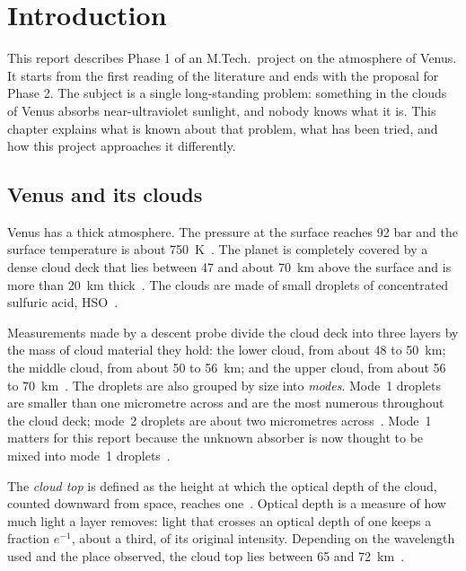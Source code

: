 
\chapter{Introduction}
\label{ch:intro}

This report describes Phase 1 of an M.Tech.\ project on the atmosphere of Venus. It
starts from the first reading of the literature and ends with the proposal for Phase 2.
The subject is a single long-standing problem: something in the clouds of Venus absorbs
near-ultraviolet sunlight, and nobody knows what it is. This chapter explains what is
known about that problem, what has been tried, and how this project approaches it
differently.

\section{Venus and its clouds}
\label{sec:venus}

Venus has a thick atmosphere. The pressure at the surface reaches 92 bar and the surface
temperature is about 750~K~\cite{dai2025review}. The planet is completely covered by a
dense cloud deck that lies between 47 and about 70~km above the surface and is more than
20~km thick~\cite{dai2025review}. The clouds are made of small droplets of concentrated
sulfuric acid, HSO~\cite{dai2025review}.

Measurements made by a descent probe divide the cloud deck into three layers by the mass
of cloud material they hold: the lower cloud, from about 48 to 50~km; the middle cloud,
from about 50 to 56~km; and the upper cloud, from about 56 to 70~km~\cite{dai2025review}.
The droplets are also grouped by size into \emph{modes}. Mode~1 droplets are smaller than
one micrometre across and are the most numerous throughout the cloud deck; mode~2
droplets are about two micrometres across~\cite{dai2025review}. Mode~1 matters for this
report because the unknown absorber is now thought to be mixed into mode~1
droplets~\cite{dai2025review,perezhoyos2018}.

The \emph{cloud top} is defined as the height at which the optical depth of the cloud,
counted downward from space, reaches one~\cite{dai2025review}. Optical depth is a
measure of how much light a layer removes: light that crosses an optical depth of one
keeps a fraction $e^{-1}$, about a third, of its original intensity. Depending on the
wavelength used and the place observed, the cloud top lies between 65 and
72~km~\cite{dai2025review}.

